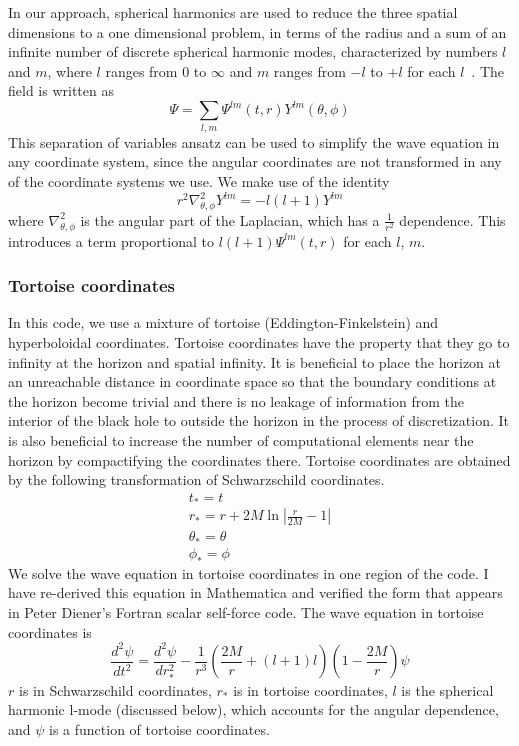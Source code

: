 In our approach, spherical harmonics are used to reduce the three spatial dimensions to a one dimensional problem, in terms of the radius and a sum of an infinite number of discrete spherical harmonic modes, characterized by numbers $l$ and $m$, where $l$ ranges from $0$ to $\infty$ and  $m$ ranges from $-l$ to $+l$ for each $l$~\cite{poisson_pound_vega_living_review}. The field is written as
\begin{equation}
  \Psi=\sum_{l,m}\Psi^{lm}(t,r)Y^{lm}(\theta,\phi)
\end{equation}
This separation of variables ansatz can be used to simplify the wave equation in any coordinate system, since the angular coordinates are not transformed in any of the coordinate systems we use. We make use of the identity
\begin{equation}
  r^2\nabla_{\theta,\phi}^2Y^{lm}=-l(l+1)Y^{lm}
\end{equation}
where $\nabla_{\theta,\phi}^2$ is the angular part of the Laplacian, which has a $\frac{1}{r^2}$ dependence. This introduces a term proportional to $l(l+1)\Psi^{lm}(t,r)$ for each $l$, $m$. 

\subsubsection{Tortoise coordinates}
In this code, we use a mixture of tortoise (Eddington-Finkelstein) and hyperboloidal coordinates. Tortoise coordinates have the property that they go to infinity at the horizon and spatial infinity. It is beneficial to place the horizon at an unreachable distance in coordinate space so that the boundary conditions at the horizon become trivial and there is no leakage of information from the interior of the black hole to outside the horizon in the process of discretization. It is also beneficial to increase the number of computational elements near the horizon by compactifying the coordinates there. Tortoise coordinates are obtained by the following transformation of Schwarzschild coordinates.~\cite{wald}
\begin{eqnarray}
  t_*=t\\
  r_*=r+2M\ln|\frac{r}{2M}-1|\\
  \theta_*=\theta\\
  \phi_*=\phi
\end{eqnarray}
We solve the wave equation in tortoise coordinates in one region of the code. I have re-derived this equation in Mathematica and verified the form that appears in Peter Diener's Fortran scalar self-force code. The wave equation in tortoise coordinates is
\begin{equation}
  \frac{d^2\psi}{dt^2}=\frac{d^2\psi}{dr_*^2}-\frac{1}{r^3}\left(\frac{2M}{r}+(l+1)l\right)\left(1-\frac{2M}{r}\right)\psi
\end{equation}
$r$ is in Schwarzschild coordinates, $r_*$ is in tortoise coordinates, $l$ is the spherical harmonic l-mode (discussed below), which accounts for the angular dependence, and $\psi$ is a function of tortoise coordinates.


